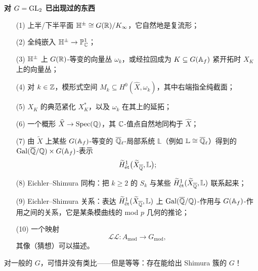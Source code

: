 \medskip
\noindent\textbf{对 $G=\operatorname{GL}_2$ 已出现过的东西}
\begin{itemize}
\item[(1)] 上半/下半平面 $\mathbb{H}^\pm\cong G(\mathbb{R})/K_\infty$，它自然地是复流形；
\item[(2)] 全纯嵌入 $\mathbb{H}^\pm\to\mathbb{P}^1_{\mathbb{C}}$；
\item[(3)] $\mathbb{H}^\pm$ 上 $G(\mathbb{R})$-等变的向量丛 $\omega_k$，或经拉回成为 $K\subseteq G(\mathbb{A}_f)$ 紧开拓时 $X_K$ 上的向量丛；
\item[(4)] 对 $k\in\mathbb{Z}$，模形式空间 $M_k\subseteq H^0(\widehat X,\omega_k)$，其中右端指全纯截面；
\item[(5)] $X_K$ 的典范紧化 $X_K^*$，以及 $\omega_k$ 在其上的延拓；
\item[(6)] 一个概形 $\widehat X\to\operatorname{Spec}(\mathbb{Q})$，其 $\mathbb{C}$-值点自然地同构于 $\widehat X$；
\item[(7)] 由 $\widetilde X$ 上某些 $G(\mathbb{A}_f)$-等变的 $\overline{\mathbb{Q}}_\ell$-局部系统 $\mathbb L$（例如 $\mathbb L\cong\overline{\mathbb{Q}}_\ell$）得到的 $\operatorname{Gal}(\overline{\mathbb{Q}}/\mathbb{Q})\times G(\mathbb{A}_f)$-表示
\[
\widetilde H^1_{\mathrm{\acute{e}t}}\bigl(\widetilde X_{\overline{\mathbb{Q}}},\mathbb L\bigr);
\]
\item[(8)] Eichler–Shimura 同构：把 $k\ge2$ 的 $S_k$ 与某些 $\widetilde H^1_{\mathrm{\acute{e}t}}(\widetilde X_{\overline{\mathbb{Q}}},\mathbb L)$ 联系起来；
\item[(9)] Eichler–Shimura 关系：表达 $\widetilde H^1_{\mathrm{\acute{e}t}}(\widetilde X_{\overline{\mathbb{Q}}},\mathbb L)$ 上 $\operatorname{Gal}(\overline{\mathbb{Q}}/\mathbb{Q})$-作用与 $G(\mathbb{A}_f)$-作用之间的关系，它是某条模曲线的 mod $p$ 几何的推论；
\item[(10)] 一个映射
\[
\mathcal{LL}\colon A_{\mathrm{mod}}\longrightarrow G_{\mathrm{mod}},
\]
其像（猜想）可以描述。
\end{itemize}

对一般的 $G$，可惜并没有类比——但是等等：存在能给出 Shimura 簇的 $G$！

